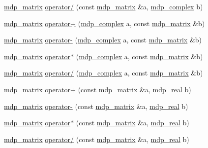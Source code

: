 \begin{DoxyCompactItemize}
\item 
\hyperlink{classmdp__matrix}{mdp\_\-matrix} \hyperlink{classmdp__matrix_afaf1606b270d6b334329a5cdf9a1c959}{operator/} (const \hyperlink{classmdp__matrix}{mdp\_\-matrix} \&a, \hyperlink{classmdp__complex}{mdp\_\-complex} b)
\item 
\hyperlink{classmdp__matrix}{mdp\_\-matrix} \hyperlink{classmdp__matrix_a179b66f81eb9cc41cf4e47424fbb043a}{operator+} (\hyperlink{classmdp__complex}{mdp\_\-complex} a, const \hyperlink{classmdp__matrix}{mdp\_\-matrix} \&b)
\item 
\hyperlink{classmdp__matrix}{mdp\_\-matrix} \hyperlink{classmdp__matrix_a505c39c420588b8e6d1071a01509ed43}{operator-\/} (\hyperlink{classmdp__complex}{mdp\_\-complex} a, const \hyperlink{classmdp__matrix}{mdp\_\-matrix} \&b)
\item 
\hyperlink{classmdp__matrix}{mdp\_\-matrix} \hyperlink{classmdp__matrix_a99f6d1150215e2cb7b00de4b6aa04633}{operator$\ast$} (\hyperlink{classmdp__complex}{mdp\_\-complex} a, const \hyperlink{classmdp__matrix}{mdp\_\-matrix} \&b)
\item 
\hyperlink{classmdp__matrix}{mdp\_\-matrix} \hyperlink{classmdp__matrix_a5a1dfe012e3c2ab574f2c60f943b36e3}{operator/} (\hyperlink{classmdp__complex}{mdp\_\-complex} a, const \hyperlink{classmdp__matrix}{mdp\_\-matrix} \&b)
\item 
\hyperlink{classmdp__matrix}{mdp\_\-matrix} \hyperlink{classmdp__matrix_a2e4fb3c9d1e2be0e26120a1947eb895a}{operator+} (const \hyperlink{classmdp__matrix}{mdp\_\-matrix} \&a, \hyperlink{mdp__global__vars_8h_a049e4c1d4e74d644878a42f9909463e4}{mdp\_\-real} b)
\item 
\hyperlink{classmdp__matrix}{mdp\_\-matrix} \hyperlink{classmdp__matrix_aa6a8885aa8604478e5e4481e1f10d700}{operator-\/} (const \hyperlink{classmdp__matrix}{mdp\_\-matrix} \&a, \hyperlink{mdp__global__vars_8h_a049e4c1d4e74d644878a42f9909463e4}{mdp\_\-real} b)
\item 
\hyperlink{classmdp__matrix}{mdp\_\-matrix} \hyperlink{classmdp__matrix_a8edf780fc5b5509630fda4dba30c8b87}{operator$\ast$} (const \hyperlink{classmdp__matrix}{mdp\_\-matrix} \&a, \hyperlink{mdp__global__vars_8h_a049e4c1d4e74d644878a42f9909463e4}{mdp\_\-real} b)
\item 
\hyperlink{classmdp__matrix}{mdp\_\-matrix} \hyperlink{classmdp__matrix_af30fb437e246a2f03a7b9c22a0e6624a}{operator/} (const \hyperlink{classmdp__matrix}{mdp\_\-matrix} \&a, \hyperlink{mdp__global__vars_8h_a049e4c1d4e74d644878a42f9909463e4}{mdp\_\-real} b)
\item 

\end{DoxyCompactItemize}

